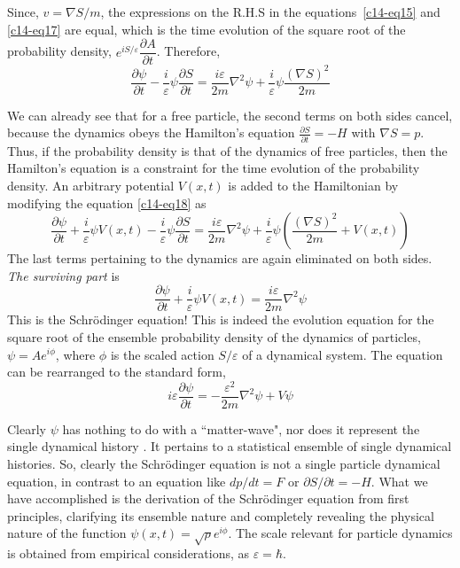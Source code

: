Since, $v = \nabla S/m$, the expressions on the R.H.S in the equations~\ref{c14-eq15} and \ref{c14-eq17} are equal,
which is the time evolution of the square root of the probability density, $e^{iS/ \varepsilon} \dfrac{\partial A}{\partial t}$. Therefore,
\begin{equation*}
\frac{\partial \psi}{\partial t} - \frac{i}{\varepsilon} \psi \frac{\partial S}{\partial t} = \frac{i\varepsilon}{2m} \nabla^2 \psi + \frac{i}{\varepsilon} \psi\frac{(\nabla S)^2}{2m} \tag{18}\label{c14-eq18}
\end{equation*}

We can already see that for a free particle, the second terms on both sides cancel, because
the dynamics obeys the Hamilton's equation $\frac{\partial S}{\partial t} = -H$
with $\nabla S = p$. Thus, if the probability density is that of the dynamics of free particles, then
the Hamilton's equation is a constraint for the time evolution of the probability density.
An arbitrary potential $V(x, t)$ is added to the Hamiltonian by modifying the equation \ref{c14-eq18} as
\begin{equation*}
\frac{\partial\psi}{\partial t}+\frac{i}{\varepsilon}\psi V(x,t)-\frac{i}{\varepsilon}\psi\frac{\partial S}{\partial t}=
\frac{i\varepsilon}{2m}\nabla^2\psi+\frac{i}{\varepsilon}\psi\left(
\frac{(\nabla S)^2}{2m}+V(x,t)\right)\tag{19}\label{c14-eq19}
\end{equation*}
The last terms pertaining to the dynamics are again eliminated on both sides. \textit{The surviving part} is
\begin{equation*}
\frac{\partial \psi}{\partial t}+\frac{i}{\varepsilon}\psi V(x,t)=\frac{i\varepsilon}{2m}\nabla^2\psi\tag{20}\label{c14-eq20}
\end{equation*}
This is the Schr\"{o}dinger equation! This is indeed the evolution equation for the square root
of the ensemble probability density of the dynamics of particles, $\psi = Ae^{i\phi}$, where $\phi$ is the
scaled action $S/\varepsilon$ of a dynamical system. The equation can be rearranged to the standard
form,
\begin{equation*}
i \varepsilon \frac{\partial \psi}{\partial t} = - \frac{\varepsilon^2}{2m} \nabla^2 \psi + V \psi \tag{21}\label{c14-eq21}
\end{equation*}

Clearly $\psi$ has nothing to do with a ``matter-wave", nor does it represent the single dynamical
history \cite{chap14-key2}. It pertains to a statistical ensemble of single dynamical histories. So, clearly the
Schr\"{o}dinger equation is not a single particle dynamical equation, in contrast to an equation
like $dp/dt = F$ or $\partial S/\partial t=-H$. What we have accomplished is the derivation of the Schr\"{o}dinger equation
from first principles, clarifying its ensemble nature and completely revealing the physical
nature of the function $\psi (x, t) = \sqrt{\rho}e^{i\phi}$. The scale relevant for particle dynamics is obtained
from empirical considerations, as $\varepsilon = \hbar$.

